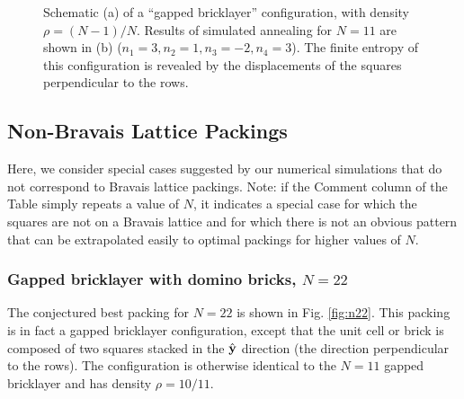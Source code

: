 \documentclass[aps]{revtex4}
\begin{document}
\begin{figure}[H]
\caption{\label{fig:gb}Schematic (a) of a ``gapped bricklayer'' configuration, with density $\rho = (N-1)/N$. Results of simulated annealing for $N=11$ are shown in (b) ($n_1=3, n_2=1, n_3=-2, n_4=3$).  The finite entropy of this configuration is revealed by the displacements of the squares perpendicular to the rows.}
\end{figure}


\subsection{Non-Bravais Lattice Packings}

Here, we consider special cases suggested by our numerical simulations that do not correspond to Bravais lattice packings.
Note: if the Comment column of the Table simply repeats a value of $N$, it indicates a special case for which the squares are not on a Bravais lattice and for which there is not an obvious pattern that can be extrapolated easily to optimal packings for higher values of $N$.

\subsubsection{Gapped bricklayer with domino bricks, $N=22$}
The conjectured best packing for $N=22$ is shown in Fig. \ref{fig:n22}. This packing is in fact a gapped bricklayer configuration, except that the unit cell or brick is composed of two squares stacked in the $\hat{{\bf y}}$ direction (the direction perpendicular to the rows).  The configuration is otherwise identical to the $N=11$ gapped bricklayer and has density $\rho= 10/11$.
\end{document}
